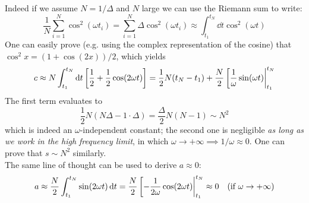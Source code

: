 \documentclass[a4paper]{article}
\newcommand{\quadre}[1]{\left[ {#1} \right]}
\begin{document}
Indeed if we assume $N=1/\Delta$ and $N$ large we can use the Riemann sum to write:
\begin{equation*}
    \frac{1}{N}\sum_{i=1}^N \cos^2(\omega t_i) = \sum_{i=1}^N \Delta \cos^2(\omega t_i) \approx \int_{t_1}^{t_N}\dd{t} \cos^2(\omega t)
\end{equation*}
One can easily prove (e.g. using the complex representation of the cosine) that $\cos^2 x = (1+\cos(2x))/2$, which yields
\begin{equation*}
    c \approx N \int_{t_1}^{t_N}\dd{t} \quadre{\frac{1}{2}+\frac{1}{2}\cos(2 \omega t)} = \frac{1}{2}N (t_N-t_1)+\frac{N}{2}\eval[\frac{1}{\omega}\sin(\omega t)|_{t_1}^{t_N}
\end{equation*}
The first term evaluates to 
\begin{equation*}
    \frac{1}{2}N (N\Delta - 1\cdot\Delta) = \frac{\Delta}{2}N(N-1) \sim N^2
\end{equation*}
which is indeed an $\omega$-independent constant; the second one is negligible \emph{as long as we work in the high frequency limit}, in which $\omega \to +\infty \implies 1/\omega \approx 0$. One can prove that $s \sim N^2$ similarly.\\
The same line of thought can be used to derive $a \approx 0$:
\begin{equation*}
    a \approx \frac{N}{2} \int_{t_1}^{t_N} \sin(2\omega t) \dd{t} = \frac{N}{2} \eval[-\frac{1}{2\omega}\cos(2\omega t)|_{t_1}^{t_N} \approx 0 \quad \text{(if $\omega \to +\infty$)}
\end{equation*}
\end{document}
